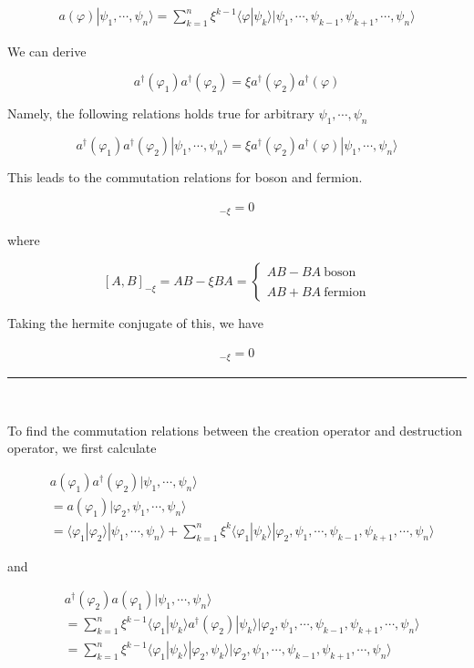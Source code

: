 ﻿\documentclass[twoside]{book}
\numberwithin{equation}{section}
\begin{document}
\begin{align}\label{Eqs1.6.2}a(\varphi)|\psi_1,\cdots,\psi_n\rangle = \sum_{k=1}^n \xi^{k-1}\langle \varphi|\psi_k\rangle |\psi_1,\cdots,\psi_{k-1},\psi_{k+1},\cdots,\psi_n\rangle \end{align}


We can derive 

\[a^\dagger(\varphi_1)a^\dagger(\varphi_2) = \xi a^\dagger(\varphi_2)a^\dagger(\varphi) \]

Namely, the following relations holds true for arbitrary $\psi_1,\cdots,\psi_n$

\[a^\dagger(\varphi_1)a^\dagger(\varphi_2)|\psi_1,\cdots,\psi_n\rangle = \xi a^\dagger(\varphi_2)a^\dagger(\varphi) |\psi_1,\cdots,\psi_n\rangle\]

This leads to the commutation relations for boson and fermion. 

\begin{align}
[a^\dagger(\varphi_1),a^\dagger(\varphi_2)]_{-\xi} = 0
\end{align}

where

\[[A,B]_{-\xi} = AB - \xi BA = \begin{cases}AB-BA\ \text{boson}\\ \ \\ AB+BA \ \text{fermion}\end{cases}\]

Taking the hermite conjugate of this, we have

\begin{align}
[a(\varphi_1),a(\varphi_2)]_{-\xi} = 0
\end{align}

\hrule

\ 

To find the commutation relations between the creation operator and destruction operator, we first calculate 

\[\begin{split}
&a(\varphi_1)a^\dagger(\varphi_2)|\psi_1,\cdots,\psi_n\rangle \\
&=a(\varphi_1)|\varphi_2,\psi_1,\cdots,\psi_n\rangle\\
&= \langle\varphi_1|\varphi_2\rangle|\psi_1,\cdots,\psi_n\rangle + \sum_{k=1}^n\xi^k\langle\varphi_1|\psi_k\rangle|\varphi_2,\psi_1,\cdots,\psi_{k-1},\psi_{k+1},\cdots,\psi_n\rangle
\end{split}\]

and

\[\begin{split}
&a^\dagger(\varphi_2)a(\varphi_1)|\psi_1,\cdots,\psi_n\rangle \\
&= \sum_{k=1}^n\xi^{k-1}\langle \varphi_1|\psi_k\rangle a^\dagger(\varphi_2)|\psi_k\rangle|\varphi_2,\psi_1,\cdots,\psi_{k-1},\psi_{k+1},\cdots,\psi_n\rangle\\
&= \sum_{k=1}^n\xi^{k-1}\langle \varphi_1|\psi_k\rangle |\varphi_2,\psi_k\rangle|\varphi_2,\psi_1,\cdots,\psi_{k-1},\psi_{k+1},\cdots,\psi_n\rangle\\
\end{split}\]
\end{document}
